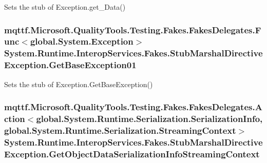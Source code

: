 Sets the stub of Exception.\-get\-\_\-\-Data()

\hypertarget{class_system_1_1_runtime_1_1_interop_services_1_1_fakes_1_1_stub_marshal_directive_exception_a763f1dd90d7ac9ced0a14ef10d4a9ec8}{
\subsubsection[{Get\-Base\-Exception01}]{\setlength{\rightskip}{0pt plus 5cm}mqttf.\-Microsoft.\-Quality\-Tools.\-Testing.\-Fakes.\-Fakes\-Delegates.\-Func$<$global.\-System.\-Exception$>$ System.\-Runtime.\-Interop\-Services.\-Fakes.\-Stub\-Marshal\-Directive\-Exception.\-Get\-Base\-Exception01}}\label{class_system_1_1_runtime_1_1_interop_services_1_1_fakes_1_1_stub_marshal_directive_exception_a763f1dd90d7ac9ced0a14ef10d4a9ec8}


Sets the stub of Exception.\-Get\-Base\-Exception()

\hypertarget{class_system_1_1_runtime_1_1_interop_services_1_1_fakes_1_1_stub_marshal_directive_exception_a9d236f876264626a468c9b7d3a8ae3f6}{
\subsubsection[{Get\-Object\-Data\-Serialization\-Info\-Streaming\-Context}]{\setlength{\rightskip}{0pt plus 5cm}mqttf.\-Microsoft.\-Quality\-Tools.\-Testing.\-Fakes.\-Fakes\-Delegates.\-Action$<$global.\-System.\-Runtime.\-Serialization.\-Serialization\-Info, global.\-System.\-Runtime.\-Serialization.\-Streaming\-Context$>$ System.\-Runtime.\-Interop\-Services.\-Fakes.\-Stub\-Marshal\-Directive\-Exception.\-Get\-Object\-Data\-Serialization\-Info\-Streaming\-Context}}\label{class_system_1_1_runtime_1_1_interop_services_1_1_fakes_1_1_stub_marshal_directive_exception_a9d236f876264626a468c9b7d3a8ae3f6}


